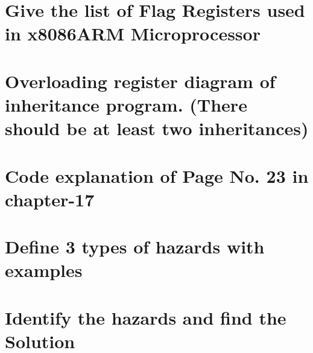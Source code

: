 \documentclass[12pt]{article}
\begin{document}
\section{Give the list of Flag Registers used in x8086ARM Microprocessor}

\section{Overloading register diagram of inheritance program. (There should be at least two inheritances)}

\section{Code explanation of Page No. 23 in chapter-17}

\section{Define 3 types of hazards with examples}

\section{Identify the hazards and find the Solution}
\end{document}
